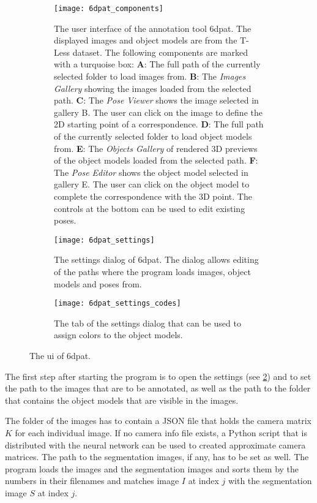 \begin{figure}[!tbp]
	\centering
	\begin{subfigure}[t]{\textwidth}
		\centering
    	\texttt{[image: 6dpat\_components]}
    	\caption{The user interface of the annotation tool \ac{6dpat}. The displayed images and object models are from the T-Less dataset. The following components are marked with a turquoise box: \textbf{A}: The full path of the currently selected folder to load images from. \textbf{B}: The \textit{Images Gallery} showing the images loaded from the selected path. \textbf{C}: The \textit{Pose Viewer} shows the image selected in gallery B. The user can click on the image to define the 2D starting point of a correspondence. \textbf{D}: The full path of the currently selected folder to load object models from. \textbf{E}: The \textit{Objects Gallery} of rendered 3D previews of the object models loaded from the selected path. \textbf{F}: The \textit{Pose Editor} shows the object model selected in gallery E. The user can click on the object model to complete the correspondence with the 3D point. The controls at the bottom can be used to edit existing poses.}
    	\label{fig:6dpat_components}
	\end{subfigure}
	\par\bigskip
	\begin{subfigure}[t]{0.47\textwidth}
		\centering
    	\texttt{[image: 6dpat\_settings]}
    	\caption{The settings dialog of \ac{6dpat}. The dialog allows editing of the paths where the program loads images, object models and poses from.}
    	\label{fig:6dpat_settings}
	\end{subfigure}
	\hfill
	\begin{subfigure}[t]{0.47\textwidth}
	\centering
    	\texttt{[image: 6dpat\_settings\_codes]}
    	\caption{The tab of the settings dialog that can be used to assign colors to the object models.}
    	\label{fig:6dpat_settings_codes}
	\end{subfigure}
	\caption{The \ac{ui} of \ac{6dpat}.}
	\label{fig:6dpat_ui_overview}
\end{figure}

The first step after starting the program is to open the settings (see \fig \ref{fig:6dpat_settings}) and to set the path to the images that are to be annotated, as well as the path to the folder that contains the object models that are visible in the images. 

The folder of the images has to contain a JSON file that holds the camera matrix $K$ for each individual image. If no camera info file exists, a Python script that is distributed with the neural network can be used to created approximate camera matrices. The path to the segmentation images, if any, has to be set as well. The program loads the images and the segmentation images and sorts them by the numbers in their filenames and matches image $I$ at index $j$ with the segmentation image $S$ at index $j$. 

